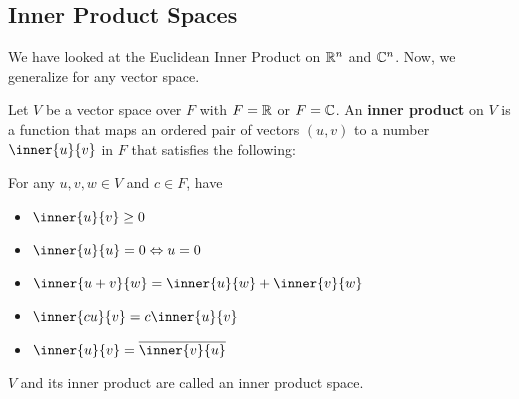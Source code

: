 \documentclass{article}
\begin{document}
    \subsection{Inner Product Spaces}
    \begin{remark}
      We have looked at the Euclidean Inner Product on $\mathbb{R}^n$ and $\mathbb{C}^n$. Now, we generalize for any vector space.
    \end{remark}
    \begin{definition}
      Let $V$ be a vector space over $F$ with $F = \mathbb{R}$ or $F = \mathbb{C}$. An \textbf{inner product} on $V$ is a function that maps an ordered pair of vectors $(u, v)$ to a number $\inner{u}{v}$ in $F$ that satisfies the following:

      For any $u, v, w \in V$ and $c \in F$, have
      \begin{itemize}
        \item $\inner{u}{v} \geq 0$
        \item $\inner{u}{u} = 0 \iff u = 0$
        \item $\inner{u+v}{w} = \inner{u}{w} + \inner{v}{w}$
        \item $\inner{cu}{v} = c\inner{u}{v}$
        \item $\inner{u}{v} = \overline{\inner{v}{u}}$
      \end{itemize}

      $V$ and its inner product are called an inner product space.
    \end{definition}
\end{document}
